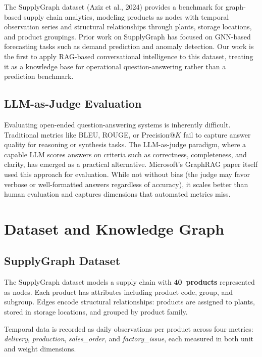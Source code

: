 \documentclass[11pt,a4paper]{article}
\begin{document}
The SupplyGraph dataset (Aziz et al., 2024) provides a benchmark for graph-based supply chain analytics, modeling products as nodes with temporal observation series and structural relationships through plants, storage locations, and product groupings. Prior work on SupplyGraph has focused on GNN-based forecasting tasks such as demand prediction and anomaly detection. Our work is the first to apply RAG-based conversational intelligence to this dataset, treating it as a knowledge base for operational question-answering rather than a prediction benchmark.

\subsection{LLM-as-Judge Evaluation}

Evaluating open-ended question-answering systems is inherently difficult. Traditional metrics like BLEU, ROUGE, or Precision@$K$ fail to capture answer quality for reasoning or synthesis tasks. The LLM-as-judge paradigm, where a capable LLM scores answers on criteria such as correctness, completeness, and clarity, has emerged as a practical alternative. Microsoft's GraphRAG paper itself used this approach for evaluation. While not without bias (the judge may favor verbose or well-formatted answers regardless of accuracy), it scales better than human evaluation and captures dimensions that automated metrics miss.

\section{Dataset and Knowledge Graph}

\subsection{SupplyGraph Dataset}

The SupplyGraph dataset models a supply chain with \textbf{40~products} represented as nodes. Each product has attributes including product code, group, and subgroup. Edges encode structural relationships: products are assigned to plants, stored in storage locations, and grouped by product family.

Temporal data is recorded as daily observations per product across four metrics: \textit{delivery}, \textit{production}, \textit{sales\_order}, and \textit{factory\_issue}, each measured in both unit and weight dimensions.
\end{document}
